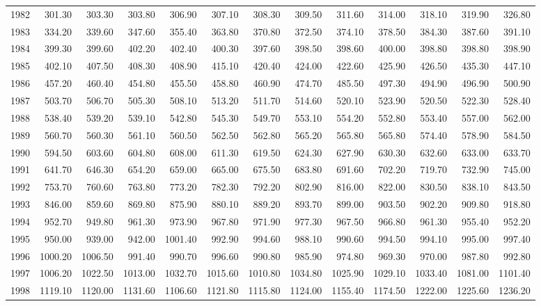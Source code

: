 \begin{longtable}{rrrrrrrrrrrrr}
  1982 & 301.30 & 303.30 & 303.80 & 306.90 & 307.10 & 308.30 & 309.50 & 311.60 & 314.00 & 318.10 & 319.90 & 326.80 \\ 
  1983 & 334.20 & 339.60 & 347.60 & 355.40 & 363.80 & 370.80 & 372.50 & 374.10 & 378.50 & 384.30 & 387.60 & 391.10 \\ 
  1984 & 399.30 & 399.60 & 402.20 & 402.40 & 400.30 & 397.60 & 398.50 & 398.60 & 400.00 & 398.80 & 398.80 & 398.90 \\ 
  1985 & 402.10 & 407.50 & 408.30 & 408.90 & 415.10 & 420.40 & 424.00 & 422.60 & 425.90 & 426.50 & 435.30 & 447.10 \\ 
  1986 & 457.20 & 460.40 & 454.80 & 455.50 & 458.80 & 460.90 & 474.70 & 485.50 & 497.30 & 494.90 & 496.90 & 500.90 \\ 
  1987 & 503.70 & 506.70 & 505.30 & 508.10 & 513.20 & 511.70 & 514.60 & 520.10 & 523.90 & 520.50 & 522.30 & 528.40 \\ 
  1988 & 538.40 & 539.20 & 539.10 & 542.80 & 545.30 & 549.70 & 553.10 & 554.20 & 552.80 & 553.40 & 557.00 & 562.00 \\ 
  1989 & 560.70 & 560.30 & 561.10 & 560.50 & 562.50 & 562.80 & 565.20 & 565.80 & 565.80 & 574.40 & 578.90 & 584.50 \\ 
  1990 & 594.50 & 603.60 & 604.80 & 608.00 & 611.30 & 619.50 & 624.30 & 627.90 & 630.30 & 632.60 & 633.00 & 633.70 \\ 
  1991 & 641.70 & 646.30 & 654.20 & 659.00 & 665.00 & 675.50 & 683.80 & 691.60 & 702.20 & 719.70 & 732.90 & 745.00 \\ 
  1992 & 753.70 & 760.60 & 763.80 & 773.20 & 782.30 & 792.20 & 802.90 & 816.00 & 822.00 & 830.50 & 838.10 & 843.50 \\ 
  1993 & 846.00 & 859.60 & 869.80 & 875.90 & 880.10 & 889.20 & 893.70 & 899.00 & 903.50 & 902.20 & 909.80 & 918.80 \\ 
  1994 & 952.70 & 949.80 & 961.30 & 973.90 & 967.80 & 971.90 & 977.30 & 967.50 & 966.80 & 961.30 & 955.40 & 952.20 \\ 
  1995 & 950.00 & 939.00 & 942.00 & 1001.40 & 992.90 & 994.60 & 988.10 & 990.60 & 994.50 & 994.10 & 995.00 & 997.40 \\ 
  1996 & 1000.20 & 1006.50 & 991.40 & 990.70 & 996.60 & 990.80 & 985.90 & 974.80 & 969.30 & 970.00 & 987.80 & 992.80 \\ 
  1997 & 1006.20 & 1022.50 & 1013.00 & 1032.70 & 1015.60 & 1010.80 & 1034.80 & 1025.90 & 1029.10 & 1033.40 & 1081.00 & 1101.40 \\ 
  1998 & 1119.10 & 1120.00 & 1131.60 & 1106.60 & 1121.80 & 1115.80 & 1124.00 & 1155.40 & 1174.50 & 1222.00 & 1225.60 & 1236.20 \\ 

\end{longtable}
